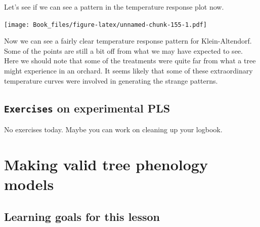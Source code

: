 \documentclass[
]{book}
\newenvironment{Shaded}{\begin{snugshade}}{\end{snugshade}}
\newcommand{\DataTypeTok}[1]{\textcolor[rgb]{0.13,0.29,0.53}{#1}}
\newcommand{\KeywordTok}[1]{\textcolor[rgb]{0.13,0.29,0.53}{\textbf{#1}}}
\newcommand{\NormalTok}[1]{#1}
\newcommand{\OperatorTok}[1]{\textcolor[rgb]{0.81,0.36,0.00}{\textbf{#1}}}
\newcommand{\StringTok}[1]{\textcolor[rgb]{0.31,0.60,0.02}{#1}}
\begin{document}
Let's see if we can see a pattern in the temperature response plot now.

\begin{Shaded}
\end{Shaded}

\texttt{[image: Book\_files/figure-latex/unnamed-chunk-155-1.pdf]}

Now we can see a fairly clear temperature response pattern for Klein-Altendorf. Some of the points are still a bit off from what we may have expected to see. Here we should note that some of the treatments were quite far from what a tree might experience in an orchard. It seems likely that some of these extraordinary temperature curves were involved in generating the strange patterns.

\hypertarget{exc_exp_PLS}{%
\section*{\texorpdfstring{\texttt{Exercises} on experimental PLS}{Exercises on experimental PLS}}\label{exc_exp_PLS}}

No exercises today. Maybe you can work on cleaning up your logbook.

\hypertarget{model_validity}{%
\chapter{Making valid tree phenology models}\label{model_validity}}

\hypertarget{goals_model_validity}{%
\section*{Learning goals for this lesson}\label{goals_model_validity}}
\end{document}
